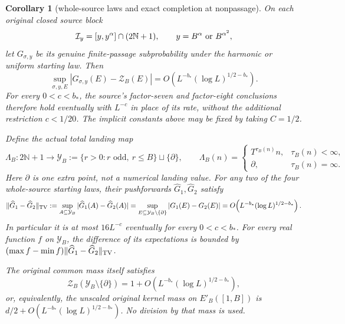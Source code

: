 \documentclass[11pt]{article}
\newtheorem{corollary}[proposition]{Corollary}
\theoremstyle{remark}\newtheorem{remark}[proposition]{Remark}
\begin{document}
\begin{corollary}[whole-source laws and exact completion at nonpassage]
\label{cor:mazur-genuine-source}
On each original closed source block
\[
 \mathcal I_y=[y,y^\alpha]\cap(2\mathbb N+1),
 \qquad y=B^\alpha\ \hbox{or}\ B^{\alpha^2},
\]
let $G_{\sigma,y}$ be its genuine finite-passage subprobability under
the harmonic or uniform starting law. Then
\[
 \sup_{\sigma,y,E}|G_{\sigma,y}(E)-\mathcal Z_B(E)|
 =O\!\left(L^{-b_*}(\log L)^{1/2-b_*}\right).
\]
For every $0<c<b_*$, the source's factor-seven and factor-eight
conclusions therefore hold eventually with $L^{-c}$ in place of
its rate, without the additional restriction $c<1/20$.
The implicit constants above may be fixed by taking $C=1/2$.

Define the actual total landing map
\[
 \Lambda_B:2\mathbb N+1\longrightarrow
 \mathcal Y_B:=\{r>0:r\text{ odd},\ r\le B\}\sqcup\{\partial\},
 \qquad
 \Lambda_B(n)=
 \begin{cases}T^{\tau_B(n)}n,&\tau_B(n)<\infty,\\
 \partial,&\tau_B(n)=\infty .
 \end{cases}
\]
Here $\partial$ is one extra point, not a numerical landing value.
For any two of the four whole-source starting laws, their pushforwards
$\widehat G_1,\widehat G_2$ satisfy
\begin{equation}
 \|\widehat G_1-\widehat G_2\|_{\rm TV}
 :=\sup_{A\subseteq\mathcal Y_B}|\widehat G_1(A)-\widehat G_2(A)|
 =\sup_{E\subseteq\mathcal Y_B\setminus\{\partial\}}
                      |G_1(E)-G_2(E)|
 =O\!\left(L^{-b_*}(\log L)^{1/2-b_*}\right).
 \label{eq:mazur-completed-tv}
\end{equation}
In particular it is at most $16L^{-c}$ eventually for every $0<c<b_*$.
For every real function $f$ on $\mathcal Y_B$, the difference of its
expectations is bounded by
$(\max f-\min f)\|\widehat G_1-\widehat G_2\|_{\rm TV}$.

The original common mass itself satisfies
\[
 \mathcal Z_B(\mathcal Y_B\setminus\{\partial\})
 =1+O\!\left(L^{-b_*}(\log L)^{1/2-b_*}\right),
\]
or, equivalently, the unscaled original kernel mass on $E'_B([1,B])$
is $d/2+O(L^{-b_*}(\log L)^{1/2-b_*})$. No division by that mass is used.
\end{corollary}
\end{document}
